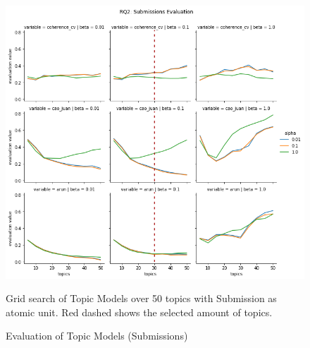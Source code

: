\documentclass{article}
\begin{document}
    \begin{figure}[H]
        \begin{centering}
        \includegraphics[width = \textwidth]{../Figure/H2_submissions_red.png}
        \caption{Evaluation of Topic Models (Submissions)}
        \end{centering}
        \begin{footnotesize} 
            Grid search of Topic Models over 50 topics with Submission as atomic unit. Red dashed shows the selected amount of topics.  
        \end{footnotesize}
    \end{figure}
\end{document}

